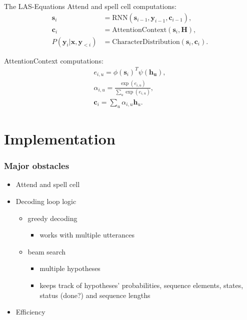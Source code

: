 \documentclass[10pt]{beamer}
\begin{document}
\begin{frame}{The LAS-Equations}
Attend and spell cell computations:
\begin{align}
	 \mathbf{s}_i &= \text{RNN}(\mathbf{s}_{i-1}, \mathbf{y}_{i-1}, \mathbf{c}_{i-1}), \\
	 \mathbf{c}_i &= \text{AttentionContext}(\mathbf{s}_i,\mathbf{H}), \\
	  P(\mathbf{y}_i|\mathbf{x}, \mathbf{y}_{<i}) &= \text{CharacterDistribution}(\mathbf{s}_i,\textbf{c}_i).
\end{align}

AttentionContext computations:
\begin{align}
	e_{i,u} = \phi(\mathbf{s}_i)^T \psi(\mathbf{h_u}), \\
	\alpha_{i,u} = \frac{ \exp(e_{i,u})}{ \sum\limits_{u} \exp(e_{i,u})}, \\
	\label{eq:alphas}
	\mathbf{c}_i = \sum\limits_{u} \alpha_{i,u} \mathbf{h}_u.
\end{align}
\end{frame}

\section{Implementation}


\begin{frame}[fragile]
\frametitle{Major obstacles}
\begin{itemize}

\item Attend and spell cell
\item Decoding loop logic
	\begin{itemize}
	\item greedy decoding
		\begin{itemize}
		\item works with multiple utterances
		\end{itemize}
	\item beam search
		\begin{itemize}
		\item multiple hypotheses
		\item keeps track of hypotheses' probabilities, sequence elements, states, status (done?) and sequence lengths
		\end{itemize}
	\end{itemize}
\item Efficiency
\end{itemize}
\end{frame}
\end{document}
